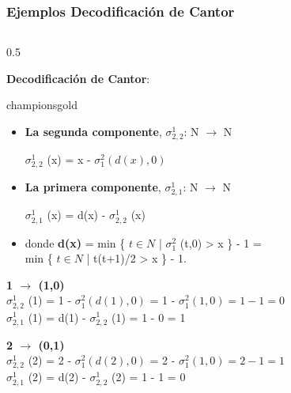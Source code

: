 \documentclass[xcolor=table]{beamer}
\begin{document}
\begin{frame}[fragile]\frametitle{Ejemplos Decodificación de Cantor} \scriptsize


\begin{columns}

    \begin{column}{0.5\textwidth}
     
    \textbf{Decodificación de Cantor}:

      \begin{colorblock}[black]{championsgold}{}\scriptsize

        \begin{itemize}
            \item \textbf{La segunda componente}, $\sigma^1_{2,2}$: N $\rightarrow$ N
            
             $\sigma^1_{2,2}$ (x) = x -  $\sigma^2_{1} (d(x),0) $
             
            
            \item \textbf{La primera componente}, $\sigma^1_{2,1}$: N $\rightarrow$ N

            $\sigma^1_{2,1}$ (x) = d(x) - $\sigma^1_{2,2}$ (x) 

            \item  donde \textbf{d(x)} = min \{ $t \in N$ | $\sigma_1^2$ (t,0) > x \} - 1 =\\
             min \{ $t \in N$ | t(t+1)/2 > x \} - 1.
        \end{itemize}

        \end{colorblock} 
\textbf{1 $\rightarrow$ (1,0)}\\

$\sigma^1_{2,2}$ (1) = 1 -  $\sigma^2_{1} (d(1),0)$ = 1 -  $\sigma^2_{1} (1,0) = 1-1 = 0$\\
$\sigma^1_{2,1}$ (1) = d(1) - $\sigma^1_{2,2}$ (1) = 1 - 0 = 1

\vspace{0.3cm}


\textbf{2 $\rightarrow$ (0,1)}\\

$\sigma^1_{2,2}$ (2) = 2 -  $\sigma^2_{1} (d(2),0)$ = 2 -  $\sigma^2_{1} (1,0) = 2-1 = 1$\\
$\sigma^1_{2,1}$ (2) = d(2) - $\sigma^1_{2,2}$ (2) = 1 - 1 = 0

    
    \end{column}


\end{columns}
\end{frame}
\end{document}
